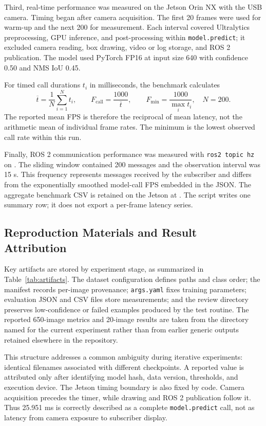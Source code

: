 \documentclass[12pt,a4paper]{article}
\begin{document}
Third, real-time performance was measured on the Jetson Orin NX with the USB camera. Timing began after camera acquisition. The first 20 frames were used for warm-up and the next 200 for measurement. Each interval covered Ultralytics preprocessing, GPU inference, and post-processing within \texttt{model.predict}; it excluded camera reading, box drawing, video or log storage, and ROS 2 publication. The model used PyTorch FP16 at input size 640 with confidence 0.50 and NMS IoU 0.45.

For timed call durations $t_i$ in milliseconds, the benchmark calculates
\begin{equation}
\overline{t}=\frac{1}{N}\sum_{i=1}^{N}t_i,\qquad
F_{\mathrm{call}}=\frac{1000}{\overline{t}},\qquad
F_{\min}=\frac{1000}{\max_i t_i},\quad N=200.
\end{equation}
The reported mean FPS is therefore the reciprocal of mean latency, not the arithmetic mean of individual frame rates. The minimum is the lowest observed call rate within this run.

Finally, ROS 2 communication performance was measured with \texttt{ros2 topic hz} on . The sliding window contained 200 messages and the observation interval was 15 s. This frequency represents messages received by the subscriber and differs from the exponentially smoothed model-call FPS embedded in the JSON. The aggregate benchmark CSV is retained on the Jetson at . The script writes one summary row; it does not export a per-frame latency series.

\subsection{Reproduction Materials and Result Attribution}

Key artifacts are stored by experiment stage, as summarized in Table~\ref{tab:artifacts}. The dataset configuration defines paths and class order; the manifest records per-image provenance; \texttt{args.yaml} fixes training parameters; evaluation JSON and CSV files store measurements; and the review directory preserves low-confidence or failed examples produced by the test routine. The reported 650-image metrics and 20-image results are taken from the directory named for the current experiment rather than from earlier generic outputs retained elsewhere in the repository.

This structure addresses a common ambiguity during iterative experiments: identical filenames associated with different checkpoints. A reported value is attributed only after identifying model hash, data version, thresholds, and execution device. The Jetson timing boundary is also fixed by code. Camera acquisition precedes the timer, while drawing and ROS 2 publication follow it. Thus 25.951 ms is correctly described as a complete \texttt{model.predict} call, not as latency from camera exposure to subscriber display.
\end{document}
